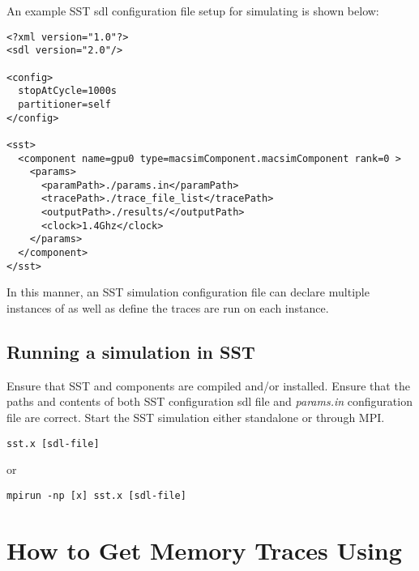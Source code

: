 An example SST sdl configuration file setup for simulating \SIM is shown below:

\begin{Verbatim}
<?xml version="1.0"?>
<sdl version="2.0"/>

<config>
  stopAtCycle=1000s
  partitioner=self
</config>

<sst>
  <component name=gpu0 type=macsimComponent.macsimComponent rank=0 >
    <params>
      <paramPath>./params.in</paramPath>
      <tracePath>./trace_file_list</tracePath>
      <outputPath>./results/</outputPath>
      <clock>1.4Ghz</clock>
    </params>
  </component>
</sst>
\end{Verbatim}

In this manner, an SST simulation configuration file can declare multiple
instances of \SIM as well as define the traces are run on each \SIM instance.

\subsection{Running a \SIM simulation in SST}

Ensure that SST and \SIM components are compiled and/or installed.  
Ensure that the paths and contents of both SST configuration sdl file and
\SIM \textit{params.in} configuration file are correct. Start the SST simulation 
either standalone or through MPI.

\begin{Verbatim}
sst.x [sdl-file]
\end{Verbatim}
or
\begin{Verbatim}
mpirun -np [x] sst.x [sdl-file]
\end{Verbatim}


\ignore
	  {
	  \section{How to Get Memory Traces Using \SIM}

	  }









